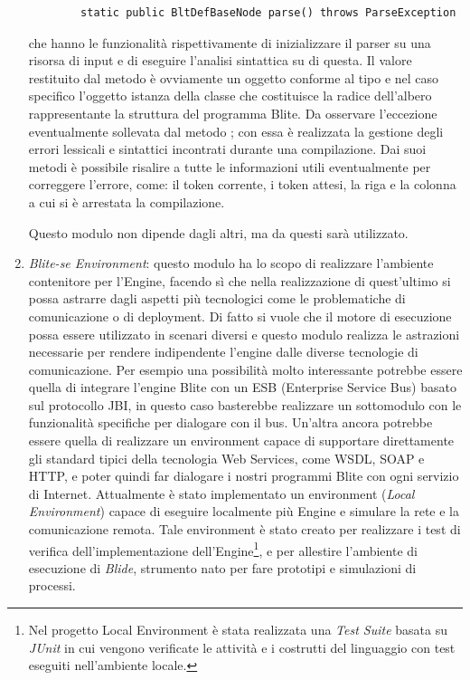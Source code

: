 \begin{enumerate}
\begin{lstlisting}
		static public BltDefBaseNode parse() throws ParseException 
  	\end{lstlisting}
	che hanno le funzionalità rispettivamente di inizializzare il parser su una
	risorsa di input e di eseguire l'analisi sintattica su di questa. Il valore
	restituito dal metodo  è ovviamente un oggetto conforme al
	tipo  e nel caso specifico l'oggetto istanza della classe
	 che costituisce la radice dell'albero
	rappresentante la struttura del programma Blite. Da osservare l'eccezione
	 eventualmente sollevata dal metodo ; con
	essa è realizzata la gestione degli errori lessicali e sintattici incontrati
	durante una compilazione. Dai suoi metodi è possibile risalire a tutte le
	informazioni utili eventualmente per correggere l'errore, come: il token
	corrente, i token attesi, la riga e la colonna a cui si è arrestata la
	compilazione.
	
	Questo modulo non dipende dagli altri, ma da questi sarà utilizzato.
	
  \item \emph{Blite-se Environment}: questo modulo ha lo scopo di realizzare
  l'ambiente contenitore per l'Engine, facendo sì che nella realizzazione di
  quest'ultimo si possa astrarre dagli aspetti più tecnologici come le
  problematiche di comunicazione o di deployment. Di fatto si vuole
  che il motore di esecuzione possa essere utilizzato in scenari
  diversi e questo modulo realizza le astrazioni necessarie per rendere
  indipendente l'engine dalle diverse tecnologie di comunicazione. Per esempio
  una possibilità molto interessante potrebbe essere quella di integrare
  l'engine Blite con un ESB (Enterprise Service Bus) basato sul protocollo JBI,
  in questo caso basterebbe realizzare un sottomodulo con le funzionalità
  specifiche per dialogare con il bus. Un'altra ancora potrebbe essere
  quella di realizzare un environment capace di supportare direttamente gli
  standard tipici della tecnologia Web Services, come WSDL, SOAP e HTTP, e
  poter quindi far dialogare i nostri programmi Blite con ogni servizio di Internet. 
  Attualmente è stato implementato un environment (\emph{Local Environment})
  capace di eseguire localmente più Engine e simulare
  la rete e la comunicazione remota. Tale environment è stato creato per 
  realizzare i test di verifica dell'implementazione dell'Engine\footnote{Nel
  progetto Local Environment è stata realizzata una \emph{Test Suite} basata su \emph{JUnit}
  in cui vengono verificate le attività e i costrutti del linguaggio con
  test eseguiti nell'ambiente locale.}, e per allestire l'ambiente di esecuzione
  di \emph{Blide}, strumento nato per fare prototipi e simulazioni di processi.
  

\end{enumerate}
